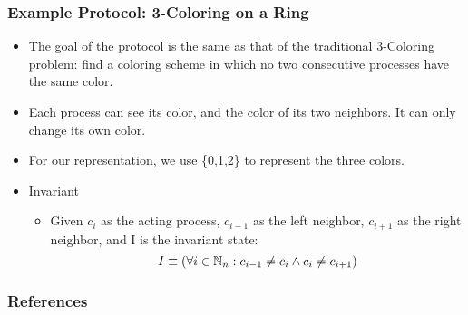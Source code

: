 \documentclass[handout]{beamer}
\begin{document}
\begin{frame}
\frametitle{Example Protocol: 3-Coloring on a Ring}
\begin{itemize}
\item The goal of the protocol is the same as that of the traditional 3-Coloring problem: find a 
    coloring scheme in which no two consecutive processes have the same color.
\item Each process can see its color, and the color of its two neighbors.  It can only change its
    own color.
\item For our representation, we use \{0,1,2\} to represent the three colors.
\item Invariant
 \begin{itemize}
 \item Given $c_i$ as the acting process, $c_{i-1}$ as the left neighbor, $c_{i+1}$ as the right
    neighbor, and I is the invariant state: 
    \[ I \equiv (\forall i\in\mathbb{N}_n: c_{i-1}\ne c_i \wedge c_i \ne c_{i+1}) \]
 \end{itemize}
\end{itemize}
\end{frame}

\begin{frame}[allowframebreaks]
\frametitle{References}


\end{frame}
\end{document}
